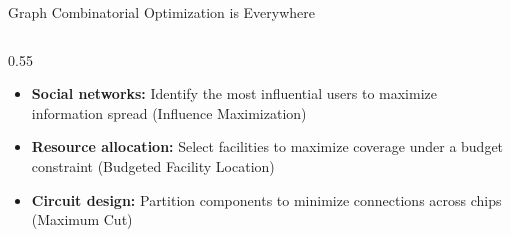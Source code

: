 \documentclass[aspectratio=169,xcolor=dvipsnames,8pt]{beamer}
\begin{document}
\begin{frame}{Graph Combinatorial Optimization is Everywhere}
  \begin{columns}
    \begin{column}{0.55\textwidth}
      \begin{itemize}
        \item \textbf{Social networks:} Identify the most influential users to maximize
          information spread (Influence Maximization)~\cite{kempe2003maximizing}
        \item \textbf{Resource allocation:} Select facilities to maximize coverage under a
          budget constraint (Budgeted Facility Location)~\cite{khuller1999budgeted}
        \item \textbf{Circuit design:} Partition components to minimize connections
          across chips (Maximum Cut)~\cite{barahona1988application}
      \end{itemize}

      \vspace{0.3cm}


\end{column}
\end{columns}
\end{frame}
\end{document}
